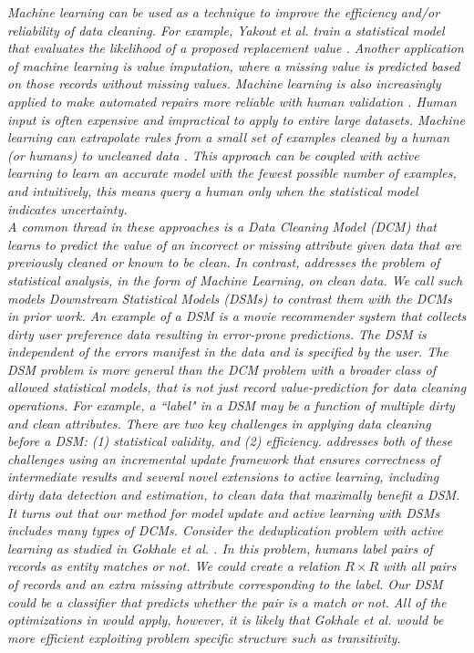\emph{Machine learning can be used as a technique to improve the efficiency and/or reliability of data cleaning\cite{yakout2013don,gokhale2014corleone}.
For example, Yakout et al. train a statistical model that evaluates the likelihood of a proposed replacement value \cite{yakout2013don}.
Another application of machine learning is value imputation, where a missing value is predicted based on those records without missing values.
Machine learning is also increasingly applied to make automated repairs more reliable with human validation \cite{DBLP:journals/pvldb/YakoutENOI11}.
Human input is often expensive and impractical to apply to entire large datasets.
Machine learning can extrapolate rules from a small set of examples cleaned by a human (or humans) to uncleaned data \cite{gokhale2014corleone, DBLP:journals/pvldb/YakoutENOI11}.
This approach can be coupled with active learning \cite{DBLP:journals/pvldb/MozafariSFJM14} to learn an accurate model with the fewest possible number of examples, and intuitively, this means
query a human only when the statistical model indicates uncertainty.\\
A common thread in these approaches is a Data Cleaning Model (DCM) that learns to predict the value of an incorrect or missing attribute given data that are previously cleaned or known to be clean.
In contrast, \sys addresses the problem of statistical analysis, in the form of Machine Learning, on clean data.
We call such models Downstream Statistical Models (DSMs) to contrast them with the DCMs in prior work.
An example of a DSM is a movie recommender system that collects dirty user preference data resulting in error-prone predictions.
The DSM is independent of the errors manifest in the data and is specified by the user.
The DSM problem is more general than the DCM problem with a broader class of allowed statistical models, that is not just record value-prediction for data cleaning operations.
For example, a ``label" in a DSM may be a function of multiple dirty and clean attributes.
There are two key challenges in applying data cleaning before a DSM: (1) statistical validity, and (2) efficiency. 
\sys addresses both of these challenges using an incremental update framework that ensures correctness of intermediate results and several novel extensions to active learning, including dirty data detection and estimation, to clean data that maximally benefit a DSM.\\
It turns out that our method for model update and active learning with DSMs includes many types of DCMs.
Consider the deduplication problem with active learning as studied in Gokhale et al. \cite{gokhale2014corleone}.
In this problem, humans label pairs of records as entity matches or not.
We could create a relation $R \times R$ with all pairs of records and an extra missing attribute corresponding to the label. 
Our DSM could be a classifier that predicts whether the pair is a match or not.
All of the optimizations in \sys would apply, however, it is likely that Gokhale et al. would be more efficient exploiting problem specific structure such as transitivity.}

